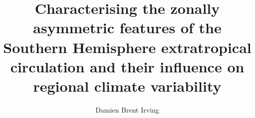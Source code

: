 \title{Characterising the zonally asymmetric features of the Southern Hemisphere extratropical circulation and their influence on regional climate variability}

\author{Damien Brent Irving}




